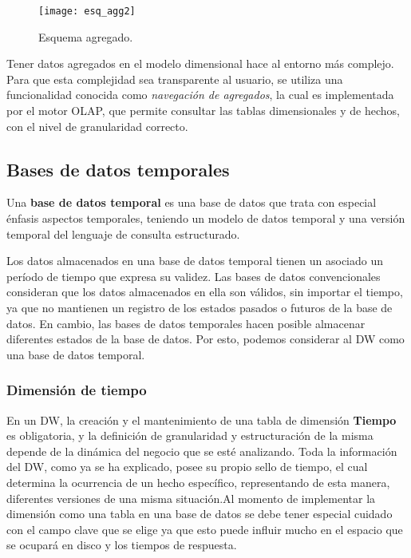 \documentclass[a4paper,11pt]{article}
\begin{document}
    \begin{figure}
      \begin{center}
        \texttt{[image: esq\_agg2]}
        \caption{Esquema agregado. \cite{agg_tables}}
        \label{sch_agg2}
      \end{center}
    \end{figure}
    
    Tener datos agregados en el modelo dimensional hace al entorno más complejo. Para que esta complejidad sea transparente al usuario, se utiliza
    una funcionalidad conocida como \textit{navegación de agregados}, la cual es implementada por el motor OLAP, que permite consultar las
    tablas dimensionales y de hechos, con el nivel de granularidad correcto.
    
    \subsection{Bases de datos temporales}
    
    Una \textbf{base de datos temporal} es una base de datos que trata con especial énfasis aspectos temporales, teniendo un modelo de datos temporal y una versión
    temporal del lenguaje de consulta estructurado.
    
    Los datos almacenados en una base de datos temporal tienen un asociado un período de tiempo que expresa su validez. Las bases de datos convencionales
    consideran que los datos almacenados en ella son válidos, sin importar el tiempo, ya que no mantienen un registro de los estados pasados o futuros de
    la base de datos. En cambio, las bases de datos temporales hacen posible almacenar diferentes estados de la base de datos. Por esto, podemos
    considerar al DW como una base de datos temporal.
    
    
    \subsubsection{Dimensión de tiempo}
    
    En un DW, la creación y el mantenimiento de una tabla de dimensión \textbf{Tiempo} es obligatoria, y la definición de granularidad y estructuración de la misma 
    depende de la dinámica del negocio que se esté analizando. Toda la información del DW, como ya se ha explicado, posee su propio sello de 
    tiempo, el cual determina la ocurrencia de un hecho específico, representando de esta manera, diferentes versiones de una misma situación.Al momento de 
    implementar la dimensión como una tabla en una base de datos se debe tener especial cuidado con el campo clave que se elige ya que esto puede influir 
    mucho en el espacio que se ocupará en disco y los tiempos de respuesta.\par
    
\end{document}

